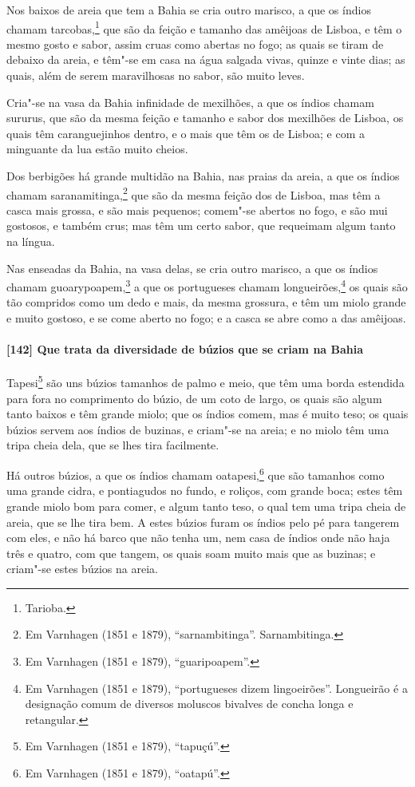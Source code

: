 \begin{linenumbers}
Nos baixos de areia que tem a Bahia se cria outro marisco, a que os índios chamam
tarcobas,\footnote{ Tarioba.} que são da feição e tamanho das amêijoas de Lisboa, e têm o
mesmo gosto e sabor, assim cruas como abertas no fogo; as quais se tiram de debaixo da
areia, e têm"-se em casa na água salgada vivas, quinze e vinte dias; as quais, além de
serem maravilhosas no sabor, são muito leves.

Cria"-se na vasa da Bahia infinidade de mexilhões, a que os índios chamam sururus, que são
da mesma feição e tamanho e sabor dos mexilhões de Lisboa, os quais têm caranguejinhos
dentro, e o mais que têm os de Lisboa; e com a minguante da lua estão muito cheios.

Dos berbigões há grande multidão na Bahia, nas praias da areia, a que os índios chamam
saranamitinga,\footnote{ Em Varnhagen (1851 e 1879), ``sarnambitinga''. Sarnambitinga.}
que são da mesma feição dos de Lisboa, mas têm a casca mais grossa, e são mais pequenos;
comem"-se abertos no fogo, e são mui gostosos, e também crus; mas têm um certo sabor, que
requeimam algum tanto na língua.

Nas enseadas da Bahia, na vasa delas, se cria outro marisco, a que os índios chamam
guoarypoapem,\footnote{ Em Varnhagen (1851 e 1879), ``guaripoapem''.} a que os portugueses
chamam longueirões,\footnote{ Em Varnhagen (1851 e 1879), ``portugueses dizem
lingoeirões''. Longueirão é a designação comum de diversos moluscos bivalves de concha
longa e retangular.} os quais são tão compridos como um dedo e mais, da mesma grossura, e
têm um miolo grande e muito gostoso, e se come aberto no fogo; e a casca se abre como a
das amêijoas.

\paragraph{[142] Que trata da diversidade de búzios que se criam na Bahia}\quad
Tapesi\footnote{ Em Varnhagen (1851 e 1879), ``tapuçú''.} são uns búzios tamanhos de palmo
e meio, que têm uma borda estendida para fora no comprimento do búzio, de um coto de
largo, os quais são algum tanto baixos e têm grande miolo; que os índios comem, mas é
muito teso; os quais búzios servem aos índios de buzinas, e criam"-se na areia; e no miolo
têm uma tripa cheia dela, que se lhes tira facilmente.

Há outros búzios, a que os índios chamam oatapesi,\footnote{ Em Varnhagen (1851 e 1879),
``oatapú''.} que são tamanhos como uma grande cidra, e pontiagudos no fundo, e roliços,
com grande boca; estes têm grande miolo bom para comer, e algum tanto teso, o qual tem uma
tripa cheia de areia, que se lhe tira bem. A estes búzios furam os índios pelo pé para
tangerem com eles, e não há barco que não tenha um, nem casa de índios onde não haja três
e quatro, com que tangem, os quais soam muito mais que as buzinas; e criam"-se estes búzios
na areia.


\end{linenumbers}
